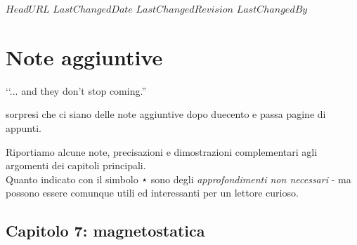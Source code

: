 \svnidlong
{$HeadURL$}
{$LastChangedDate$}
{$LastChangedRevision$}
{$LastChangedBy$}

\chapter{Note aggiuntive}
\begin{introduction}
‘‘... and they don't stop coming.''
\begin{flushright}
	 sorpresi che ci siano delle note aggiuntive dopo duecento e passa pagine di appunti.
\end{flushright}
\end{introduction}

\noindent Riportiamo alcune note, precisazioni e dimostrazioni complementari agli argomenti dei capitoli principali.\\
Quanto indicato con il simbolo ⋆ sono degli \textit{approfondimenti non necessari} - ma possono essere comunque utili ed interessanti per un lettore curioso.
\section{Capitolo 7: magnetostatica}
